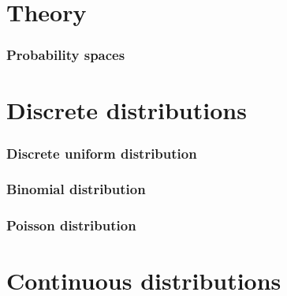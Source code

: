 \documentclass[12pt]{article}
\theoremstyle{definition}
\theoremstyle{definition}
\theoremstyle{theorem}
\begin{document}
	
	\tableofcontents
	\pagebreak
	
	
	\part{Theory}
	\section{Probability spaces}
	
	
	\part{Discrete distributions}
	\section{Discrete uniform distribution}
	
	
	\section{Binomial distribution}
	
	
	\section{Poisson distribution}
	
	
	\part{Continuous distributions}
	
	
\end{document}
